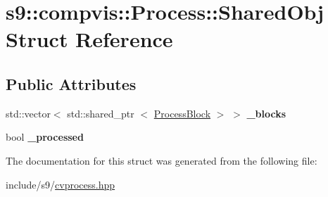 \hypertarget{structs9_1_1compvis_1_1Process_1_1SharedObj}{\section{s9\-:\-:compvis\-:\-:\-Process\-:\-:\-Shared\-Obj \-Struct \-Reference}
\label{structs9_1_1compvis_1_1Process_1_1SharedObj}
}
\subsection*{\-Public \-Attributes}
\begin{DoxyCompactItemize}
\item 
\hypertarget{structs9_1_1compvis_1_1Process_1_1SharedObj_a24b21fbf48c1277a6c233e9e47e0c3de}{std\-::vector$<$ std\-::shared\-\_\-ptr\*
$<$ \hyperlink{classs9_1_1compvis_1_1ProcessBlock}{\-Process\-Block} $>$ $>$ {\bfseries \-\_\-blocks}}\label{structs9_1_1compvis_1_1Process_1_1SharedObj_a24b21fbf48c1277a6c233e9e47e0c3de}

\item 
\hypertarget{structs9_1_1compvis_1_1Process_1_1SharedObj_a9a81f3d2f6a292d40f49b7ded0acebb1}{bool {\bfseries \-\_\-processed}}\label{structs9_1_1compvis_1_1Process_1_1SharedObj_a9a81f3d2f6a292d40f49b7ded0acebb1}

\end{DoxyCompactItemize}


\-The documentation for this struct was generated from the following file\-:\begin{DoxyCompactItemize}
\item 
include/s9/\hyperlink{cvprocess_8hpp}{cvprocess.\-hpp}\end{DoxyCompactItemize}
